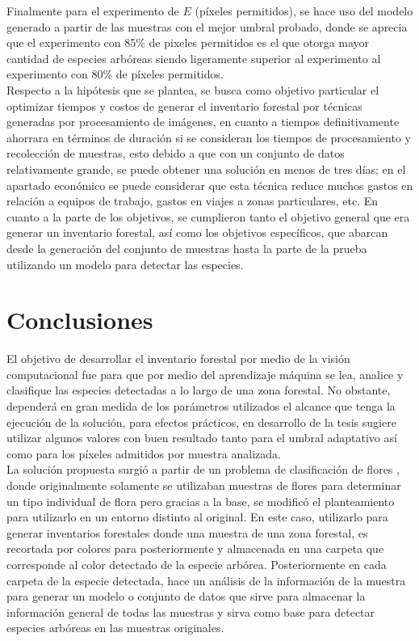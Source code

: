 \documentclass[review]{elsarticle}
\begin{document}
Finalmente para el experimento de $E$ (píxeles permitidos), se hace uso del modelo generado a partir de las muestras con el mejor umbral probado, donde se aprecia que el experimento con 85\% de pixeles permitidos es el que otorga mayor cantidad de especies arbóreas siendo ligeramente superior al experimento al experimento con 80\% de píxeles permitidos.\\

Respecto a la hipótesis que se plantea, se busca como objetivo particular el optimizar tiempos y costos de generar el inventario forestal por técnicas generadas por procesamiento de imágenes, en cuanto a tiempos definitivamente ahorrara en términos de duración si se consideran los tiempos de procesamiento y recolección de muestras, esto debido a que con un conjunto de datos relativamente grande, se puede obtener una solución en menos de tres días; en el apartado económico se puede considerar que esta técnica reduce muchos gastos en relación a equipos de trabajo, gastos en viajes a zonas particulares, etc. En cuanto a la parte de los objetivos, se cumplieron tanto el objetivo general que era generar un inventario forestal, así como los objetivos específicos, que abarcan desde la generación del conjunto de muestras hasta la parte de la prueba utilizando un modelo para detectar las especies.

\section{Conclusiones}
El objetivo de desarrollar el inventario forestal por medio de la visión computacional fue para que por medio del aprendizaje máquina se lea, analice y clasifique las especies detectadas a lo largo de una zona forestal. No obstante, dependerá en gran medida de los parámetros utilizados el alcance que tenga la ejecución de la solución, para efectos prácticos, en desarrollo de la tesis sugiere utilizar algunos valores con buen resultado tanto para el umbral adaptativo así como para los píxeles admitidos por muestra analizada.\\

La solución propuesta surgió a partir de un problema de clasificación de flores \citep{rf17},  donde originalmente solamente se utilizaban muestras de flores para determinar un tipo individual de flora pero gracias a la base, se modificó el planteamiento para utilizarlo en un entorno distinto al original. En este caso, utilizarlo para generar inventarios forestales donde una muestra de una zona forestal, es recortada por colores para posteriormente y almacenada en una carpeta que corresponde al color detectado de la especie arbórea. Posteriormente en cada carpeta de la especie detectada, hace un análisis de la información de la muestra para generar un modelo  o conjunto de datos que sirve para almacenar la información general de todas las muestras y sirva como base para detectar especies arbóreas en las muestras originales.\\
\end{document}
